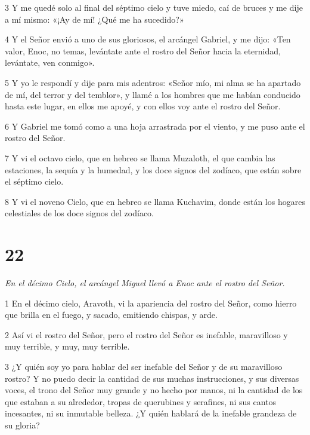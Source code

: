 \par 3 Y me quedé solo al final del séptimo cielo y tuve miedo, caí de bruces y me dije a mí mismo: «¡Ay de mí! ¿Qué me ha sucedido?»

\par 4 Y el Señor envió a uno de sus gloriosos, el arcángel Gabriel, y me dijo: «Ten valor, Enoc, no temas, levántate ante el rostro del Señor hacia la eternidad, levántate, ven conmigo».

\par 5 Y yo le respondí y dije para mis adentros: «Señor mío, mi alma se ha apartado de mí, del terror y del temblor», y llamé a los hombres que me habían conducido hasta este lugar, en ellos me apoyé, y con ellos voy ante el rostro del Señor.

\par 6 Y Gabriel me tomó como a una hoja arrastrada por el viento, y me puso ante el rostro del Señor.

\par 7 Y vi el octavo cielo, que en hebreo se llama Muzaloth, el que cambia las estaciones, la sequía y la humedad, y los doce signos del zodíaco, que están sobre el séptimo cielo.

\par 8 Y vi el noveno Cielo, que en hebreo se llama Kuchavim, donde están los hogares celestiales de los doce signos del zodíaco.

\chapter{22}

\par \textit{En el décimo Cielo, el arcángel Miguel llevó a Enoc ante el rostro del Señor.}

\par 1 En el décimo cielo, Aravoth, vi la apariencia del rostro del Señor, como hierro que brilla en el fuego, y sacado, emitiendo chispas, y arde.

\par 2 Así vi el rostro del Señor, pero el rostro del Señor es inefable, maravilloso y muy terrible, y muy, muy terrible.

\par 3 ¿Y quién soy yo para hablar del ser inefable del Señor y de su maravilloso rostro? Y no puedo decir la cantidad de sus muchas instrucciones, y sus diversas voces, el trono del Señor muy grande y no hecho por manos, ni la cantidad de los que estaban a su alrededor, tropas de querubines y serafines, ni sus cantos incesantes, ni su inmutable belleza. ¿Y quién hablará de la inefable grandeza de su gloria?

